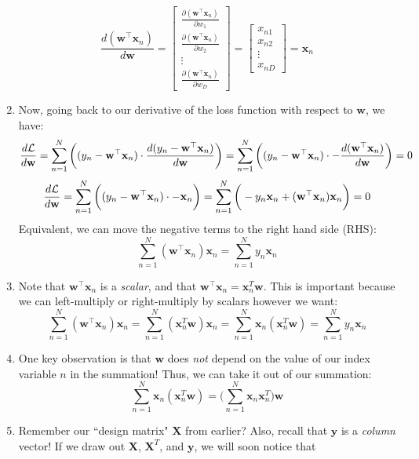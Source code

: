 \documentclass[11pt,letterpaper]{article}
\begin{document}
\begin{enumerate}
    $$\frac{d(\mathbf{w}^\top\mathbf{x}_n)}{d\mathbf{w}} = 
    \begin{bmatrix}
    \frac{\partial (\mathbf{w}^\top\mathbf{x}_n)}{\partial w_1} \\
    \frac{\partial (\mathbf{w}^\top\mathbf{x}_n)}{\partial w_2} \\
    \vdots \\
    \frac{\partial (\mathbf{w}^\top\mathbf{x}_n)}{\partial w_D}
    \end{bmatrix} = 
    \begin{bmatrix}
    x_{n1} \\
    x_{n2} \\
    \vdots \\
    x_{nD}
    \end{bmatrix} = \mathbf{x}_n$$
    \item Now, going back to our derivative of the loss function with respect to $\mathbf{w}$, we have:
    $$\frac{d\mathcal{L}}{d\mathbf{w}} = \sum_{n=1}^N \bigg((y_n - \mathbf{w}^\top\mathbf{x}_n) \cdot \frac{d(y_n - \mathbf{w}^\top\mathbf{x}_n)}{d\mathbf{w}}\bigg) = 
    \sum_{n=1}^N \bigg((y_n - \mathbf{w}^\top\mathbf{x}_n) \cdot -\frac{d(\mathbf{w}^\top\mathbf{x}_n)}{d\mathbf{w}}\bigg) = 0$$
    $$\frac{d\mathcal{L}}{d\mathbf{w}} = \sum_{n=1}^N \bigg((y_n - \mathbf{w}^\top\mathbf{x}_n) \cdot -\mathbf{x}_n\bigg) = \sum_{n=1}^N \bigg(-y_n \mathbf{x}_n + (\mathbf{w}^\top\mathbf{x}_n)\mathbf{x}_n\bigg) = 0$$
    Equivalent, we can move the negative terms to the right hand side (RHS):
    $$\sum_{n=1}^N (\mathbf{w}^\top\mathbf{x}_n)\mathbf{x}_n = \sum_{n=1}^N y_n \mathbf{x}_n$$
    \item Note that $\mathbf{w}^\top\mathbf{x}_n$ is a \emph{scalar}, and that $\mathbf{w}^\top\mathbf{x}_n = \mathbf{x}_n^{T}\mathbf{w}$. This is important because we can left-multiply or right-multiply by scalars however we want:
    $$\sum_{n=1}^N (\mathbf{w}^\top\mathbf{x}_n)\mathbf{x}_n = \sum_{n=1}^N (\mathbf{x}_n^{T}\mathbf{w})\mathbf{x}_n = \sum_{n=1}^N \mathbf{x}_n (\mathbf{x}_n^{T}\mathbf{w})=\sum_{n=1}^N y_n \mathbf{x}_n$$
    \item One key observation is that $\mathbf{w}$ does \emph{not} depend on the value of our index variable $n$ in the summation! Thus, we can take it out of our summation:
    $$\sum_{n=1}^N \mathbf{x}_n (\mathbf{x}_n^{T}\mathbf{w}) = \bigg(\sum_{n=1}^N \mathbf{x}_n \mathbf{x}_n^{T}\bigg)\mathbf{w}$$
    \item Remember our ``design matrix" $\mathbf{X}$ from earlier? Also, recall that $\mathbf{y}$ is a \emph{column} vector! If we draw out $\mathbf{X}$, $\mathbf{X}^{T}$, and $\mathbf{y}$, we will soon notice that

\end{enumerate}
\end{document}
